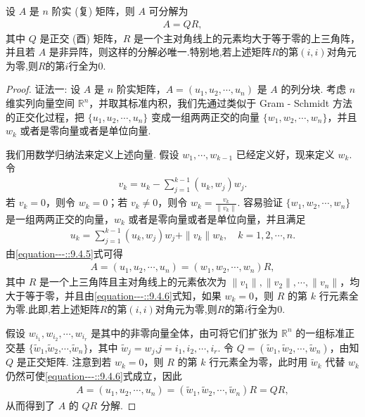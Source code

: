 \documentclass[../../main.tex]{subfiles}
\begin{document}
\begin{theorem}[矩阵的QR分解]\label{theorem:矩阵的QR分解}
设 $A$ 是 $n$ 阶实 (复) 矩阵，则 $A$ 可分解为
\begin{align*}
A = QR,
\end{align*}
其中 $Q$ 是正交 (酉) 矩阵，$R$ 是一个主对角线上的元素均大于等于零的上三角阵，并且若 $A$ 是非异阵，则这样的分解必唯一.特别地,若上述矩阵$R$的第$(i,i)$对角元为零,则$R$的第$i$行全为0.
\end{theorem}
\begin{proof}
{\color{blue}证法一:}
设 $A$ 是 $n$ 阶实矩阵，$A = (u_1,u_2,\cdots,u_n)$ 是 $A$ 的列分块. 考虑 $n$ 维实列向量空间 $\mathbb{R}^n$，并取其标准内积，我们先通过类似于 Gram - Schmidt 方法的正交化过程，把 $\{u_1,u_2,\cdots,u_n\}$ 变成一组两两正交的向量 $\{w_1,w_2,\cdots,w_n\}$，并且 $w_k$ 或者是零向量或者是单位向量.

我们用数学归纳法来定义上述向量. 假设 $w_1,\cdots,w_{k - 1}$ 已经定义好，现来定义 $w_k$. 令
\begin{align*}
v_k = u_k - \sum_{j = 1}^{k - 1}(u_k,w_j)w_j.
\end{align*}
若 $v_k = 0$，则令 $w_k = 0$；若 $v_k \neq 0$，则令 $w_k = \frac{v_k}{\|v_k\|}$. 容易验证 $\{w_1,w_2,\cdots,w_n\}$ 是一组两两正交的向量，$w_k$ 或者是零向量或者是单位向量，并且满足
\begin{align}
u_k = \sum_{j = 1}^{k - 1}(u_k,w_j)w_j + \|v_k\|w_k,\quad k = 1,2,\cdots,n.\label{equation---::9.4.5}
\end{align}
由\eqref{equation---::9.4.5}式可得
\begin{align}
A = (u_1,u_2,\cdots,u_n) = (w_1,w_2,\cdots,w_n)R,\label{equation---::9.4.6}
\end{align}
其中 $R$ 是一个上三角阵且主对角线上的元素依次为 $\|v_1\|,\|v_2\|,\cdots,\|v_n\|$，均大于等于零，并且由\eqref{equation---::9.4.6}式知，如果 $w_k = 0$，则 $R$ 的第 $k$ 行元素全为零.此即,若上述矩阵$R$的第$(i,i)$对角元为零,则$R$的第$i$行全为0.

假设 $w_{i_1},w_{i_2},\cdots,w_{i_r}$ 是其中的非零向量全体，由可将它们扩张为 $\mathbb{R}^n$ 的一组标准正交基 $\{\widetilde{w}_1$,$\widetilde{w}_2$,$\cdots$,$\widetilde{w}_n\}$，其中 $\widetilde{w}_j = w_j$,$j = i_1,i_2,\cdots,i_r$. 令 $Q = (\widetilde{w}_1,\widetilde{w}_2,\cdots,\widetilde{w}_n)$，由知 $Q$ 是正交矩阵. 注意到若 $w_k = 0$，则 $R$ 的第 $k$ 行元素全为零，此时用 $\widetilde{w}_k$ 代替 $w_k$ 仍然可使\eqref{equation---::9.4.6}式成立，因此
\begin{align*}
A = (u_1,u_2,\cdots,u_n) = (\widetilde{w}_1,\widetilde{w}_2,\cdots,\widetilde{w}_n)R = QR,
\end{align*}
从而得到了 $A$ 的 $QR$ 分解.


\end{proof}
\end{document}
